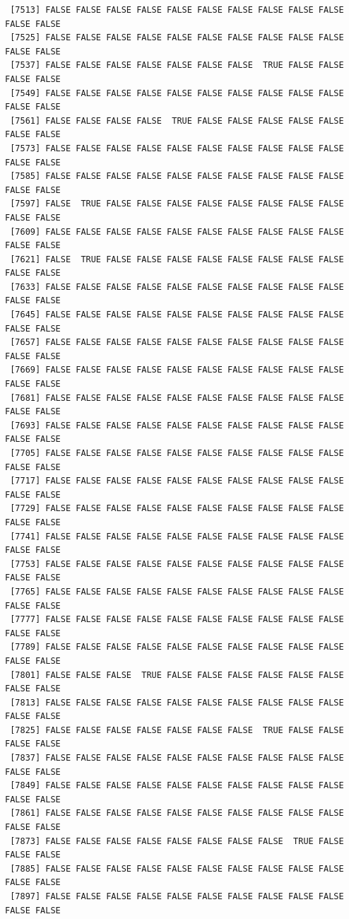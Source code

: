 \documentclass[
  a4paper,
  DIV=11,
  numbers=noendperiod]{scrartcl}
\begin{document}
\begin{verbatim}
 [7513] FALSE FALSE FALSE FALSE FALSE FALSE FALSE FALSE FALSE FALSE FALSE FALSE
 [7525] FALSE FALSE FALSE FALSE FALSE FALSE FALSE FALSE FALSE FALSE FALSE FALSE
 [7537] FALSE FALSE FALSE FALSE FALSE FALSE FALSE  TRUE FALSE FALSE FALSE FALSE
 [7549] FALSE FALSE FALSE FALSE FALSE FALSE FALSE FALSE FALSE FALSE FALSE FALSE
 [7561] FALSE FALSE FALSE FALSE  TRUE FALSE FALSE FALSE FALSE FALSE FALSE FALSE
 [7573] FALSE FALSE FALSE FALSE FALSE FALSE FALSE FALSE FALSE FALSE FALSE FALSE
 [7585] FALSE FALSE FALSE FALSE FALSE FALSE FALSE FALSE FALSE FALSE FALSE FALSE
 [7597] FALSE  TRUE FALSE FALSE FALSE FALSE FALSE FALSE FALSE FALSE FALSE FALSE
 [7609] FALSE FALSE FALSE FALSE FALSE FALSE FALSE FALSE FALSE FALSE FALSE FALSE
 [7621] FALSE  TRUE FALSE FALSE FALSE FALSE FALSE FALSE FALSE FALSE FALSE FALSE
 [7633] FALSE FALSE FALSE FALSE FALSE FALSE FALSE FALSE FALSE FALSE FALSE FALSE
 [7645] FALSE FALSE FALSE FALSE FALSE FALSE FALSE FALSE FALSE FALSE FALSE FALSE
 [7657] FALSE FALSE FALSE FALSE FALSE FALSE FALSE FALSE FALSE FALSE FALSE FALSE
 [7669] FALSE FALSE FALSE FALSE FALSE FALSE FALSE FALSE FALSE FALSE FALSE FALSE
 [7681] FALSE FALSE FALSE FALSE FALSE FALSE FALSE FALSE FALSE FALSE FALSE FALSE
 [7693] FALSE FALSE FALSE FALSE FALSE FALSE FALSE FALSE FALSE FALSE FALSE FALSE
 [7705] FALSE FALSE FALSE FALSE FALSE FALSE FALSE FALSE FALSE FALSE FALSE FALSE
 [7717] FALSE FALSE FALSE FALSE FALSE FALSE FALSE FALSE FALSE FALSE FALSE FALSE
 [7729] FALSE FALSE FALSE FALSE FALSE FALSE FALSE FALSE FALSE FALSE FALSE FALSE
 [7741] FALSE FALSE FALSE FALSE FALSE FALSE FALSE FALSE FALSE FALSE FALSE FALSE
 [7753] FALSE FALSE FALSE FALSE FALSE FALSE FALSE FALSE FALSE FALSE FALSE FALSE
 [7765] FALSE FALSE FALSE FALSE FALSE FALSE FALSE FALSE FALSE FALSE FALSE FALSE
 [7777] FALSE FALSE FALSE FALSE FALSE FALSE FALSE FALSE FALSE FALSE FALSE FALSE
 [7789] FALSE FALSE FALSE FALSE FALSE FALSE FALSE FALSE FALSE FALSE FALSE FALSE
 [7801] FALSE FALSE FALSE  TRUE FALSE FALSE FALSE FALSE FALSE FALSE FALSE FALSE
 [7813] FALSE FALSE FALSE FALSE FALSE FALSE FALSE FALSE FALSE FALSE FALSE FALSE
 [7825] FALSE FALSE FALSE FALSE FALSE FALSE FALSE  TRUE FALSE FALSE FALSE FALSE
 [7837] FALSE FALSE FALSE FALSE FALSE FALSE FALSE FALSE FALSE FALSE FALSE FALSE
 [7849] FALSE FALSE FALSE FALSE FALSE FALSE FALSE FALSE FALSE FALSE FALSE FALSE
 [7861] FALSE FALSE FALSE FALSE FALSE FALSE FALSE FALSE FALSE FALSE FALSE FALSE
 [7873] FALSE FALSE FALSE FALSE FALSE FALSE FALSE FALSE  TRUE FALSE FALSE FALSE
 [7885] FALSE FALSE FALSE FALSE FALSE FALSE FALSE FALSE FALSE FALSE FALSE FALSE
 [7897] FALSE FALSE FALSE FALSE FALSE FALSE FALSE FALSE FALSE FALSE FALSE FALSE

\end{verbatim}
\end{document}
